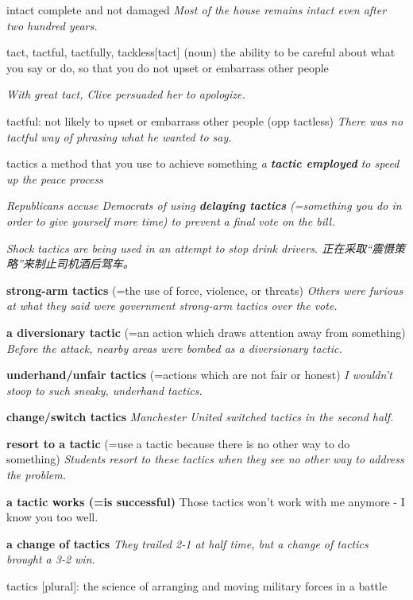 \begin{DefWord}{intact}
    complete and not damaged
    \textit{Most of the house remains intact even after two hundred years.}

\end{DefWord}

\begin{DefWord}{tact, tactful, tactfully, tackless}[tact]
    (noun) the ability to be careful about what you say or do, so that you do not upset or embarrass other people

    \textit{With great tact, Clive persuaded her to apologize.}

    tactful: not likely to upset or embarrass other people (opp tactless)
    \textit{There was no tactful way of phrasing what he wanted to say.}
\end{DefWord}

\begin{DefWord}{tactics}
    a method that you use to achieve something
    \textit{a \textbf{tactic employed} to speed up the peace process}

    \textit{Republicans accuse Democrats of using \textbf{delaying tactics} (=something you do in order to give yourself more time) to prevent a final vote on the bill.}

    \textit{Shock tactics are being used in an attempt to stop drink drivers. 正在采取“震慑策略”来制止司机酒后驾车。}

    \textbf{strong-arm tactics} (=the use of force, violence, or threats)
    \textit{Others were furious at what they said were government strong-arm tactics over the vote.}

    \textbf{a diversionary tactic} (=an action which draws attention away from something)
    \textit{Before the attack, nearby areas were bombed as a diversionary tactic.}

    \textbf{underhand/unfair tactics} (=actions which are not fair or honest)
    \textit{I wouldn't stoop to such sneaky, underhand tactics.}

    \textbf{change/switch tactics}
    \textit{Manchester United switched tactics in the second half.}

    \textbf{resort to a tactic} (=use a tactic because there is no other way to do something)
    \textit{Students resort to these tactics when they see no other way to address the problem.}

    \textbf{a tactic works (=is successful)}
    Those tactics won't work with me anymore - I know you too well.

    \textbf{a change of tactics}
    \textit{They trailed 2-1 at half time, but a change of tactics brought a 3-2 win.}

    tactics [plural]: the science of arranging and moving military forces in a battle

\end{DefWord}

